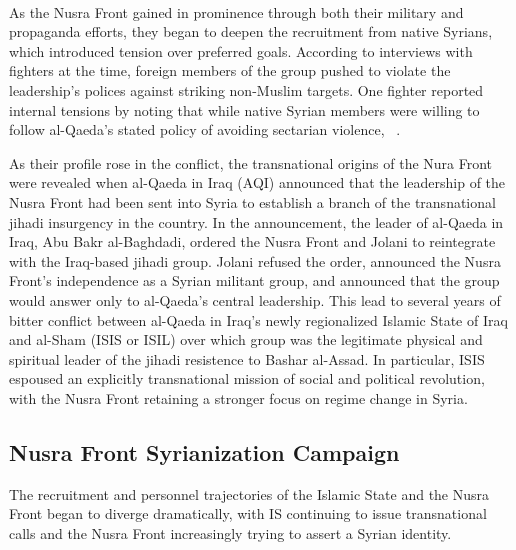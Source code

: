 ~\autocite{marrouch2013nusra}

As the Nusra Front gained in prominence through both their military and propaganda efforts, they began to deepen the recruitment from native Syrians, which introduced tension over preferred goals. According to interviews with fighters at the time, foreign members of the group pushed to violate the leadership’s polices against striking non-Muslim targets. One fighter reported internal tensions by noting that while native Syrian members were willing to follow al-Qaeda’s stated policy of avoiding sectarian violence, ~\autocite{sherlock2012inside}.

As their profile rose in the conflict, the transnational origins of the Nura Front were revealed when al-Qaeda in Iraq  (AQI) announced that the leadership of the Nusra Front had been sent into Syria to establish a branch of the transnational jihadi insurgency in the country. In the announcement, the leader of al-Qaeda in Iraq, Abu Bakr al-Baghdadi, ordered the Nusra Front and Jolani to reintegrate with the Iraq-based jihadi group. Jolani refused the order, announced the Nusra Front’s independence as a Syrian militant group, and announced that the group would answer only to al-Qaeda’s central leadership. This lead to several years of bitter conflict between al-Qaeda in Iraq’s newly regionalized Islamic State of Iraq and al-Sham (ISIS or ISIL) over which group was the legitimate physical and spiritual leader of the jihadi resistence to Bashar al-Assad.  In particular, ISIS espoused an explicitly transnational mission of social and political revolution, with the Nusra Front retaining a stronger focus on regime change in Syria. 

\subsection{Nusra Front Syrianization Campaign}

The recruitment and personnel trajectories of the Islamic State and the Nusra Front began to diverge dramatically, with IS continuing to issue transnational calls and the Nusra Front increasingly trying to assert a Syrian identity. 

